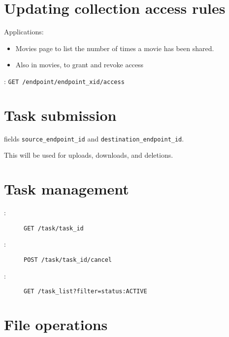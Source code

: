
\section{Updating collection access rules\label{section:updatingcollectionaccessrules}}

Applications:
\begin{itemize}
  \item Movies page to list the number of times a movie has been shared.
  \item Also in movies, to grant and revoke access
\end{itemize}

\noindent {}: 
\texttt{GET /endpoint/endpoint\_xid/access}

\section{Task submission}

 fields \texttt{source\_endpoint\_id} 
and \texttt{destination\_endpoint\_id}.

This will be used for uploads, downloads, and deletions.

\section{Task management\label{section:taskmanagement}}

\begin{description}
  \item[:] \texttt{GET /task/task\_id} 
  \item[:] \texttt{POST /task/task\_id/cancel}
  \item[:] \texttt{GET /task\_list?filter=status:ACTIVE}
\end{description}

\section{File operations}

